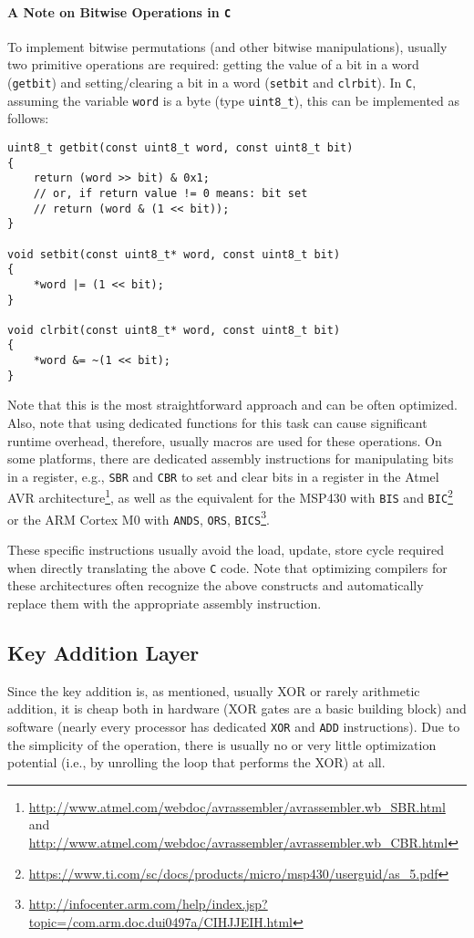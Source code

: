 \paragraph{A Note on Bitwise Operations in \texttt{C}}
To implement bitwise permutations (and other bitwise manipulations), usually two primitive operations are required: getting the value of a bit in a word (\texttt{getbit}) and setting/clearing a bit in a word (\texttt{setbit} and \texttt{clrbit}). In \texttt{C}, assuming the variable \texttt{word} is a byte (type \texttt{uint8\_t}), this can be implemented as follows:

\begin{verbatim}
uint8_t getbit(const uint8_t word, const uint8_t bit)
{
    return (word >> bit) & 0x1;
    // or, if return value != 0 means: bit set
    // return (word & (1 << bit));
}

void setbit(const uint8_t* word, const uint8_t bit)
{
    *word |= (1 << bit);
}

void clrbit(const uint8_t* word, const uint8_t bit)
{
    *word &= ~(1 << bit);
}

\end{verbatim}
 
Note that this is the most straightforward approach and can be often optimized. Also, note that using dedicated functions for this task can cause significant runtime overhead, therefore, usually macros are used for these operations. 
%
On some platforms, there are dedicated assembly instructions for manipulating bits in a register, e.g., \texttt{SBR} and \texttt{CBR} to set and clear bits in a register in the Atmel AVR architecture\footnote{\url{http://www.atmel.com/webdoc/avrassembler/avrassembler.wb_SBR.html} and \url{http://www.atmel.com/webdoc/avrassembler/avrassembler.wb_CBR.html}}, as well as the equivalent for the MSP430 with \texttt{BIS} and \texttt{BIC}\footnote{\url{https://www.ti.com/sc/docs/products/micro/msp430/userguid/as_5.pdf}} or the ARM Cortex M0 with \texttt{ANDS}, \texttt{ORS}, \texttt{BICS}\footnote{\url{http://infocenter.arm.com/help/index.jsp?topic=/com.arm.doc.dui0497a/CIHJJEIH.html}}. 

These specific instructions usually avoid the load, update, store cycle required when directly translating the above \texttt{C} code. Note that optimizing compilers for these architectures often recognize the above constructs and automatically replace them with the appropriate assembly instruction.


\subsection{Key Addition Layer}
Since the key addition is, as mentioned, usually \ac{XOR} or rarely arithmetic addition, it is cheap both in hardware (\ac{XOR} gates are a basic building block) and software (nearly every processor has dedicated \verb+XOR+ and \verb+ADD+ instructions). Due to the simplicity of the operation, there is usually no or very little optimization potential (i.e., by unrolling the loop that performs the \ac{XOR}) at all. 


